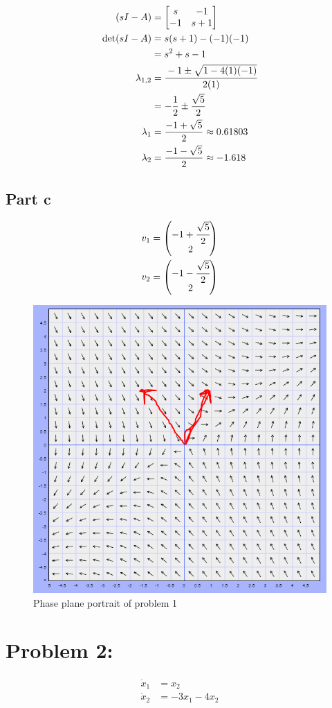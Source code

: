 \documentclass[]{article}
\begin{document}
\begin{align*}
	(sI - A)
	&= \mqty[s & -1\\ -1 & s+1]\\
	\det(sI-A)
	&= s(s+1) - (-1)(-1)\\
	&= s^2 + s - 1\\
	\lambda_{1,2}
	&= \cfrac{-1 \pm \sqrt{1 - 4(1)(-1)}}{2(1)}\\
	&= -\frac{1}{2} \pm \frac{\sqrt{5}}{2}\\
	\lambda_1
	&= \frac{-1 + \sqrt{5}}{2} \approx 0.61803\\
	\lambda_2
	&= \frac{-1 - \sqrt{5}}{2} \approx -1.618
\end{align*}

\subsection{Part c}

\begin{align*}
	v_1 &= \mqty(-1 + \cfrac{\sqrt{5}}{2}\\ 2)\\
	v_2 &= \mqty(-1 - \cfrac{\sqrt{5}}{2}\\ 2)
\end{align*}

\begin{figure}[p]
	\centering
	\includegraphics[width=0.7\linewidth]{fig/pblm1_w_vectors}
	\caption{Phase plane portrait of problem 1}
	\label{fig:pblm1}
\end{figure}


\newpage
\section{Problem 2:}
\begin{align*}
	\dot{x}_1 &= x_2\\
	\dot{x}_2 &= -3 x_1 - 4 x_2
\end{align*}
\end{document}
